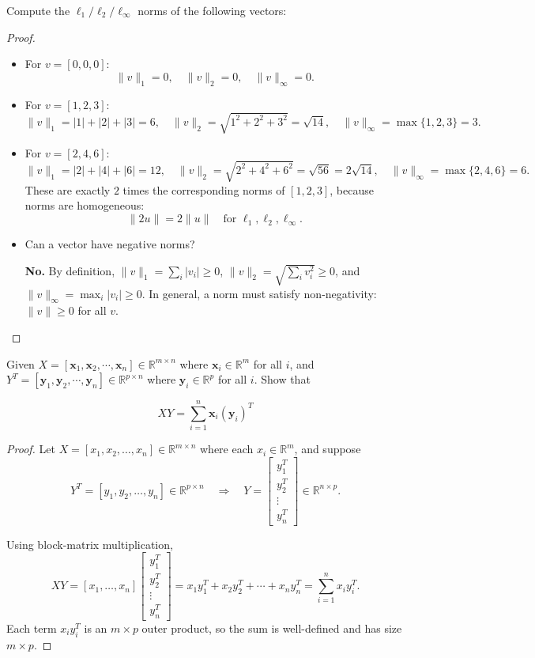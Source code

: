 \documentclass[en,hazy,blue,12pt,normal]{elegantnote}
\begin{document}
\begin{homework}
    Compute the $\ell_1 / \ell_2 / \ell_{\infty}$ norms of the following vectors:
\end{homework}

\begin{proof}
    \begin{itemize}
\item For $v=[0,0,0]$:
\[
\|v\|_1=0,\quad \|v\|_2=0,\quad \|v\|_\infty=0.
\]

\item For $v=[1,2,3]$:
\[
\|v\|_1=|1|+|2|+|3|=6,\quad
\|v\|_2=\sqrt{1^2+2^2+3^2}=\sqrt{14},\quad
\|v\|_\infty=\max\{1,2,3\}=3.
\]

\item For $v=[2,4,6]$:
\[
\|v\|_1=|2|+|4|+|6|=12,\quad
\|v\|_2=\sqrt{2^2+4^2+6^2}=\sqrt{56}=2\sqrt{14},\quad
\|v\|_\infty=\max\{2,4,6\}=6.
\]
These are exactly $2$ times the corresponding norms of $[1,2,3]$, because norms are homogeneous:
\[
\|2u\| = 2\|u\|\quad \text{for } \ell_1,\ell_2,\ell_\infty.
\]

\item Can a vector have negative norms?

\textbf{No.} By definition, $\|v\|_1=\sum_i |v_i|\ge 0$, $\|v\|_2=\sqrt{\sum_i v_i^2}\ge 0$, and $\|v\|_\infty=\max_i |v_i|\ge 0$. In general, a norm must satisfy non-negativity: $\|v\|\ge 0$ for all $v$.
\end{itemize}
\end{proof}

\begin{homework}
    Given $X=\left[\mathbf{x}_1, \mathbf{x}_2, \cdots, \mathbf{x}_n\right] \in \mathbb{R}^{m \times n}$ where $\mathbf{x}_i \in \mathbb{R}^m$ for all $i$, and $Y^T= \left[\mathbf{y}_1, \mathbf{y}_2, \cdots, \mathbf{y}_n\right] \in \mathbb{R}^{p \times n}$ where $\mathbf{y}_i \in \mathbb{R}^p$ for all $i$. Show that

$$
X Y=\sum_{i=1}^n \mathbf{x}_i\left(\mathbf{y}_i\right)^T
$$
\end{homework}

\begin{proof}
    Let $X=[x_1,x_2,\dots,x_n]\in\mathbb{R}^{m\times n}$ where each $x_i\in\mathbb{R}^m$, and suppose
\[
Y^T = [y_1,y_2,\dots,y_n]\in\mathbb{R}^{p\times n}
\quad\Longrightarrow\quad
Y=
\begin{bmatrix}
y_1^T\\
y_2^T\\
\vdots\\
y_n^T
\end{bmatrix}\in\mathbb{R}^{n\times p}.
\]

Using block-matrix multiplication,
\[
XY = [x_1,\dots,x_n]
\begin{bmatrix}
y_1^T\\
y_2^T\\
\vdots\\
y_n^T
\end{bmatrix}
=
x_1y_1^T + x_2y_2^T + \cdots + x_n y_n^T
=
\sum_{i=1}^n x_i y_i^T.
\]
Each term $x_i y_i^T$ is an $m\times p$ outer product, so the sum is well-defined and has size $m\times p$.
\end{proof}
\end{document}
